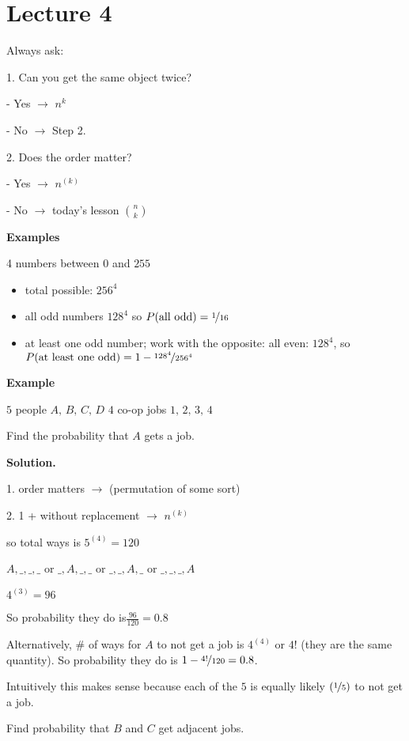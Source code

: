 \section{Lecture 4}
Always ask:

1. Can you get the same object twice?

- Yes $ \rightarrow $ $ n^k $

- No $ \rightarrow $ Step 2.

2. Does the order matter?

- Yes $ \rightarrow $ $ n^{(k)} $

- No $ \rightarrow $ today's lesson $ \binom{n}{k} $

\textbf{Examples}

4 numbers between $ 0 $ and $ 255 $
\begin{itemize}
    \item total possible: $256^4$
    \item all odd numbers $ 128^4 $ so $ P(\text{all odd})=\nicefrac{1}{16} $
    \item at least one odd number; work with the opposite: all even: $ 128^4 $,
    so $ P(\text{at least one odd})=1-\nicefrac{128^4}{256^4} $
\end{itemize}

\textbf{Example}

$ 5 $ people $ A,\,B,\,C,\,D $ $ 4 $ co-op jobs $ 1,\,2,\,3,\,4 $

Find the probability that $ A $ gets a job.

\textbf{Solution.}

1. order matters $ \rightarrow $ (permutation of some sort)

2. 1 + without replacement $ \rightarrow $ $ n^{(k)} $

so total ways is $ 5^{(4)}=120 $

$ A,\_,\_,\_ $ or $ \_,A,\_,\_ $ or $\_,\_,A,\_$ or $\_,\_,\_,A$ 

$ 4^{(3)}=96 $

So probability they do is$ \frac{96}{120} =0.8 $

Alternatively, \# of ways for $ A $ to not get a job is $ 4^{(4)} $ or $ 4! $
(they are the same quantity).
So probability they do is $ 1-\nicefrac{4!}{120}=0.8 $.

Intuitively this makes sense because each of the $ 5 $ is equally likely
$ (\nicefrac{1}{5}) $ to not get a job.

Find probability that $ B $ and $ C $ get adjacent jobs.

